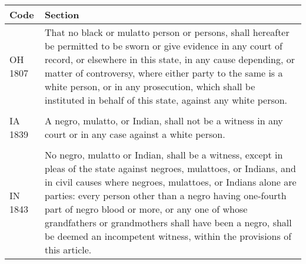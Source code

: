 \documentclass[12pt,]{article}
\begin{document}
\begin{longtable}[]{@{}ll@{}}
\toprule
\begin{minipage}[b]{0.17\columnwidth}\raggedright
Code\strut
\end{minipage} & \begin{minipage}[b]{0.77\columnwidth}\raggedright
Section\strut
\end{minipage}\tabularnewline
\midrule
\endhead
\begin{minipage}[t]{0.17\columnwidth}\raggedright
OH 1807\strut
\end{minipage} & \begin{minipage}[t]{0.77\columnwidth}\raggedright
That no black or mulatto person or persons, shall hereafter be permitted
to be sworn or give evidence in any court of record, or elsewhere in
this state, in any cause depending, or matter of controversy, where
either party to the same is a white person, or in any prosecution, which
shall be instituted in behalf of this state, against any white
person.\strut
\end{minipage}\tabularnewline
\begin{minipage}[t]{0.17\columnwidth}\raggedright
\strut
\end{minipage} & \begin{minipage}[t]{0.77\columnwidth}\raggedright
\strut
\end{minipage}\tabularnewline
\begin{minipage}[t]{0.17\columnwidth}\raggedright
IA 1839\strut
\end{minipage} & \begin{minipage}[t]{0.77\columnwidth}\raggedright
A negro, mulatto, or Indian, shall not be a witness in any court or in
any case against a white person.\strut
\end{minipage}\tabularnewline
\begin{minipage}[t]{0.17\columnwidth}\raggedright
\strut
\end{minipage} & \begin{minipage}[t]{0.77\columnwidth}\raggedright
\strut
\end{minipage}\tabularnewline
\begin{minipage}[t]{0.17\columnwidth}\raggedright
IN 1843\strut
\end{minipage} & \begin{minipage}[t]{0.77\columnwidth}\raggedright
No negro, mulatto or Indian, shall be a witness, except in pleas of the
state against negroes, mulattoes, or Indians, and in civil causes where
negroes, mulattoes, or Indians alone are parties: every person other
than a negro having one-fourth part of negro blood or more, or any one
of whose grandfathers or grandmothers shall have been a negro, shall be
deemed an incompetent witness, within the provisions of this
article.\strut
\end{minipage}\tabularnewline
\bottomrule
\end{longtable}
\end{document}
